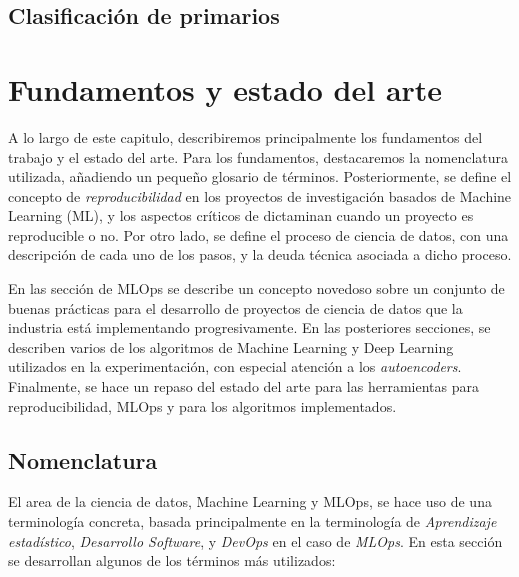 \documentclass[
  12pt,
  a4paperpaper,
]{report}
\begin{document}
\hypertarget{clasificaciuxf3n-de-primarios}{%
\section{Clasificación de
primarios}\label{clasificaciuxf3n-de-primarios}}

\hypertarget{fundamentos-y-estado-del-arte}{%
\chapter{Fundamentos y estado del
arte}\label{fundamentos-y-estado-del-arte}}

A lo largo de este capitulo, describiremos principalmente los
fundamentos del trabajo y el estado del arte. Para los fundamentos,
destacaremos la nomenclatura utilizada, añadiendo un pequeño glosario de
términos. Posteriormente, se define el concepto de
\emph{reproducibilidad} en los proyectos de investigación basados de
Machine Learning (ML), y los aspectos críticos de dictaminan cuando un
proyecto es reproducible o no. Por otro lado, se define el proceso de
ciencia de datos, con una descripción de cada uno de los pasos, y la
deuda técnica asociada a dicho proceso.

En las sección de MLOps se describe un concepto novedoso sobre un
conjunto de buenas prácticas para el desarrollo de proyectos de ciencia
de datos que la industria está implementando progresivamente. En las
posteriores secciones, se describen varios de los algoritmos de Machine
Learning y Deep Learning utilizados en la experimentación, con especial
atención a los \emph{autoencoders}. Finalmente, se hace un repaso del
estado del arte para las herramientas para reproducibilidad, MLOps y
para los algoritmos implementados.

\hypertarget{nomenclatura}{%
\section{Nomenclatura}\label{nomenclatura}}

El area de la ciencia de datos, Machine Learning y MLOps, se hace uso de
una terminología concreta, basada principalmente en la terminología de
\emph{Aprendizaje estadístico}, \emph{Desarrollo Software}, y
\emph{DevOps} en el caso de \emph{MLOps}. En esta sección se desarrollan
algunos de los términos más utilizados:
\end{document}
